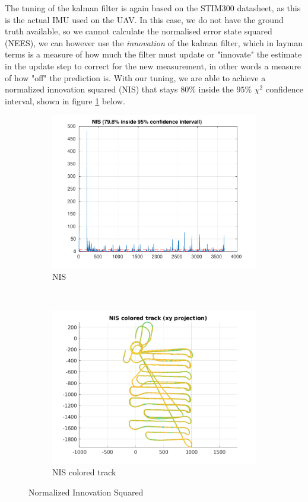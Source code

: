 The tuning of the kalman filter is again based on the STIM300 datasheet, as this is the actual IMU used on the UAV. In this case, we do not have the ground truth available, so we cannot calculate the normalised error state squared (NEES), we can however use the \textit{innovation} of the kalman filter, which in layman terms is a measure of how much the filter must update or "innovate" the estimate in the update step to correct for the new measurement, in other words a measure of how "off" the prediction is. With our tuning, we are able to achieve a normalized innovation squared (NIS) that stays $80\%$ inside the $95\%$ $\chi^2$ confidence interval, shown in figure \ref{fig:nis_basic} below.
\begin{figure}[H]
        \centering
        \begin{subfigure}[b]{0.45\textwidth}
                \includegraphics[width=\textwidth]{plots/a2-real-nis}
                \caption{NIS }
                \label{fig:nis_basic}
        \end{subfigure}%
~
        \begin{subfigure}[b]{0.45\textwidth}
                \includegraphics[width=\textwidth]{plots/a2-real-nis-colored-track}
                \caption{NIS colored track}
                \label{fig:nis_colored_track}
        \end{subfigure}
        \caption{Normalized Innovation Squared}
        \label{fig:nis}
\end{figure}

